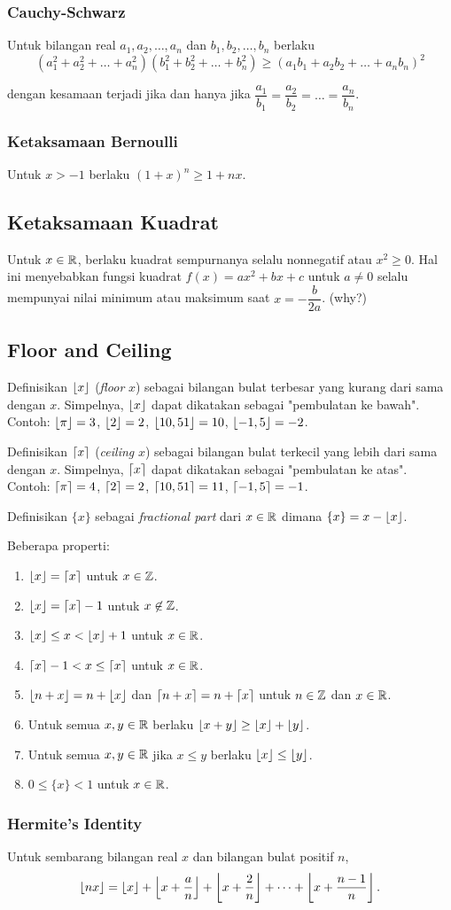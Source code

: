 \subsubsection{Cauchy-Schwarz}
Untuk bilangan real $a_1,a_2,\dots,a_n$ dan $b_1,b_2,\dots,b_n$ berlaku
$$(a_1^2+a_2^2+\dots+a_n^2)(b_1^2+b_2^2+\dots+b_n^2) \ge (a_1b_1+a_2b_2+\dots+a_nb_n)^2$$

dengan kesamaan terjadi jika dan hanya jika $\dfrac{a_1}{b_1}=\dfrac{a_2}{b_2}=\dots =\dfrac{a_n}{b_n}$.

\subsubsection{Ketaksamaan Bernoulli}
Untuk $x > -1$ berlaku $(1+x)^n \ge 1+nx$.

\subsection{Ketaksamaan Kuadrat}
Untuk $x \in \mathbb R$, berlaku kuadrat sempurnanya selalu nonnegatif atau $x^2 \ge 0$. Hal ini menyebabkan fungsi kuadrat $f(x)=ax^2+bx+c$ untuk $a \neq 0$ selalu mempunyai nilai minimum atau maksimum saat $x = -\dfrac{b}{2a}$. (why?)

\subsection{Floor and Ceiling}
Definisikan $\left\lfloor x \right\rfloor$ (\textit{floor} $x$) sebagai bilangan bulat terbesar yang kurang dari sama dengan $x$. Simpelnya, $\left\lfloor x \right\rfloor$ dapat dikatakan sebagai "pembulatan ke bawah". Contoh: $\left\lfloor \pi \right\rfloor=3$, $\left\lfloor 2 \right\rfloor=2$, $\left\lfloor 10,51 \right\rfloor=10$, $\left\lfloor -1,5 \right\rfloor=-2$.

Definisikan $\left\lceil x \right\rceil$ (\textit{ceiling} $x$) sebagai bilangan bulat terkecil yang lebih dari sama dengan $x$. Simpelnya, $\left\lceil x \right\rceil$ dapat dikatakan sebagai "pembulatan ke atas". Contoh: $\left\lceil \pi \right\rceil=4$, $\left\lceil 2 \right\rceil=2$, $\left\lceil 10,51 \right\rceil=11$, $\left\lceil -1,5 \right\rceil=-1$.

Definisikan $\{x\}$ sebagai \textit{fractional part} dari $x \in \mathbb R$ dimana $\{x\} = x - \left\lfloor x \right\rfloor$.

Beberapa properti:
\begin{enumerate}
    \item $\left\lfloor x \right\rfloor=\left\lceil x \right\rceil$ untuk $x \in \mathbb Z$.
    \item $\left\lfloor x \right\rfloor=\left\lceil x \right\rceil-1$ untuk $x \not \in \mathbb Z$.
    \item $\left\lfloor x \right\rfloor \le  x < \left\lfloor x \right\rfloor+1$ untuk $x \in \mathbb R$.
    \item $\left\lceil x \right\rceil-1 < x \le \left\lceil x \right\rceil$ untuk $x \in \mathbb R$.
    \item $\left\lfloor n+x \right\rfloor=n+\left\lfloor x \right\rfloor$ dan $\left\lceil n+x \right\rceil=n+\left\lceil x \right\rceil$ untuk $n\in \mathbb Z$ dan $x \in \mathbb R$.
    \item Untuk semua $x,y \in \mathbb R$ berlaku $\left\lfloor x+y \right\rfloor \ge \left\lfloor x \right\rfloor+\left\lfloor y \right\rfloor$.
    \item Untuk semua $x,y \in \mathbb R$ jika $x \le y$ berlaku $\left\lfloor x \right\rfloor \le \left\lfloor y \right\rfloor$.
    \item $0 \le \{x\} < 1$ untuk $x \in \mathbb R$.
\end{enumerate}
\subsubsection{Hermite's Identity}
Untuk sembarang bilangan real $x$ dan bilangan bulat positif $n$,
$$\left\lfloor nx \right\rfloor=\left\lfloor x \right\rfloor+\left\lfloor x+\dfrac{a}{n} \right\rfloor+\left\lfloor x+\dfrac{2}{n} \right\rfloor+\dots+\left\lfloor x+\dfrac{n-1}{n} \right\rfloor.$$

